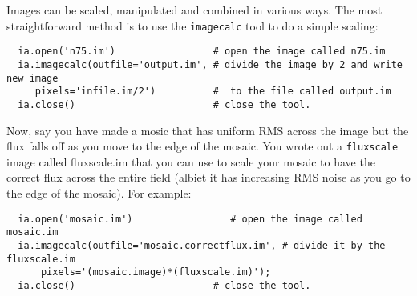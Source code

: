 Images can be scaled, manipulated and combined in various ways.  The
most straightforward method is to use the {\tt imagecalc} tool to do a
simple scaling: 

\small
\begin{verbatim}
  ia.open('n75.im')                 # open the image called n75.im
  ia.imagecalc(outfile='output.im', # divide the image by 2 and write new image 
     pixels='infile.im/2')          #  to the file called output.im
  ia.close()                        # close the tool. 
\end{verbatim}
\normalsize

Now, say you have made a mosic that has uniform RMS across the image
but the flux falls off as you move to the edge of the mosaic.  You
wrote out a {\tt fluxscale} image called fluxscale.im that you can
use to scale your mosaic to have the correct flux across the entire
field (albiet it has increasing RMS noise as you go to the edge of the
mosaic).  For example: 

\small
\begin{verbatim}
  ia.open('mosaic.im')                 # open the image called mosaic.im
  ia.imagecalc(outfile='mosaic.correctflux.im', # divide it by the fluxscale.im
      pixels='(mosaic.image)*(fluxscale.im)');
  ia.close()                        # close the tool. 
\end{verbatim}
\normalsize



